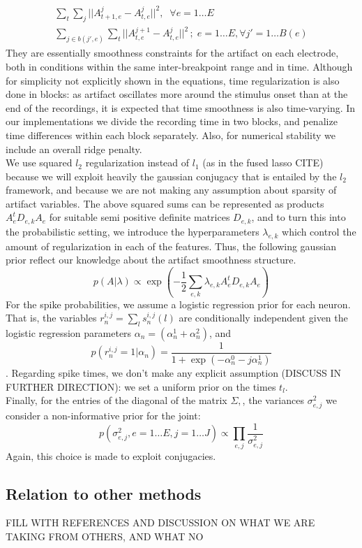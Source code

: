 \documentclass[12pt,letterpaper,fleqn]{article}
\begin{document}
\begin{eqnarray}
\nonumber \sum_t\sum_j ||A_{t+1,e}^j-A_{t,e}^j||^2,\;\;\forall e=1\ldots E \\
\nonumber \sum_{j\in b(j',e)}\sum_t ||A_{t,e}^{j+1}-A_{t,e}^j||^2\,;\; e=1\ldots E,\forall j' =1\ldots B(e)
\end{eqnarray}
They are essentially smoothness constraints for the artifact on each electrode, both in conditions within the same inter-breakpoint range and in time. Although for simplicity not explicitly shown in the equations, time regularization is also done in blocks: as artifact oscillates more around the stimulus onset than at the end of the recordings, it is expected that time smoothness is also time-varying. In our implementations we divide the recording time in two blocks, and penalize time differences within each block separately. Also, for numerical stability we include an overall ridge penalty.\\
We use squared $l_2$ regularization instead of $l_1$ (as in the fused lasso CITE)  because we will exploit heavily the gaussian conjugacy that is entailed by the $l_2$ framework, and because we are not making any assumption about sparsity of artifact variables. The above squared sums can be represented as products $A_e^tD_{e,k}A_e$ for suitable semi positive definite matrices $D_{e,k}$, and to turn this into the probabilistic setting, we introduce the hyperparameters $\lambda_{e,k} $ which control the amount of regularization in each of the features. Thus, the following gaussian prior reflect our knowledge about the artifact smoothness structure.
$$p(A|\lambda)\propto \exp\left(-\dfrac{1}{2} \sum_{e,k} \lambda_{e,k} A_e^tD_{e,k}A_e\right)$$
For the spike probabilities, we assume a logistic regression prior for each neuron. That is, the variables  $r_n^{i,j}=\sum_{l}s_n^{i,j}(l)$ are conditionally independent given the logistic regression parameters $\alpha_n=(\alpha_n^1+\alpha_n^2)$, and 
$$p(r_n^{i,j}=1|\alpha_n)=\dfrac{1}{1+\exp\left(-\alpha^0_n-j\alpha^1_n  \right)}$$. Regarding spike times, we don't make any explicit assumption (DISCUSS IN FURTHER DIRECTION): we set a uniform prior on the times $t_{l}$. \\
Finally, for the entries of the diagonal of the matrix $\Sigma,$, the variances $\sigma^2_{e,j}$ we consider a non-informative prior for the joint: $$p(\sigma^2_{e,j},e=1\ldots E,j=1\ldots J)\propto \prod_{e,j} \frac{1}{\sigma^2_{e,j}}$$
Again, this choice is made to exploit conjugacies.
\subsection{Relation to other methods}
FILL WITH REFERENCES AND DISCUSSION ON WHAT WE ARE TAKING FROM OTHERS, AND WHAT NO
\end{document}
